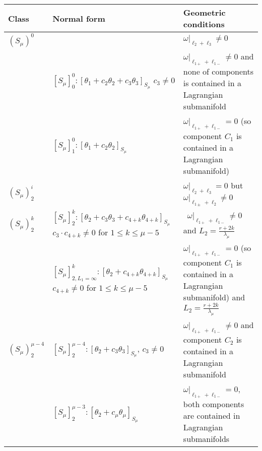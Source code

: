 \documentclass{amsart}
\theoremstyle{definition}
\numberwithin{equation}{section}
\begin{document}
\begin{center}
\begin{table}[h]
    \begin{small}
    \noindent
    \begin{tabular}{|p{1.2cm}|p{4.6cm}|p{6cm}|}
          
            \hline
    Class &  Normal form & Geometric conditions  \\ \hline

   $(S_{\mu})^0$ & & $ \omega|_{\ell_2+\ell_3} \ne 0$  \\ \cline{2-3}
         & $[S_{\mu}]^0_0: [\theta _1 + c_2\theta _2 + c_3\theta _3]_{S_{\mu}}$
   \newline $ c_3\ne 0$ & $\omega|_{\ell_{1+}+\ell_{1-}}\! \ne 0$ \; and  none of components is contained in a Lagrangian submanifold \\ \cline{2-3}
     & $[S_{\mu}]^0_1: [\theta _1 +c_2\theta _2 ]_{S_{\mu}}$ & $\omega |_{\ell_{1+}+\ell_{1-}}\!=0$ \; (so component $C_1$ is contained in a Lagrangian submanifold) \\ \hline \hline

  $(S_{\mu}\!)^{i}_2$ & &  $\omega|_{\ell_2+\ell_3} = 0$ but $\omega|_{\ell_{1\pm}+\ell_2} \ne 0$ \\ \hline
 $(S_{\mu}\!)^{k}_2$  & $[S_{\mu}]^{k}_2\!: [\theta _2\!+\! c_3\theta_3\!+\!c_{4+k}\theta_{4+k}]_{S_{\mu}}$
                                                    \newline $c_3\cdot c_{4+k} \ne 0$ for $1\leq k\leq\mu-5$ &  \ $\omega|_{\ell_{1+}+\ell_{1-}} \ne 0$ and $L_2=\frac{r+2k}{\lambda_{\mu}}$  \\ \cline{2-3}
 & $[S_{\mu}]^{k}_{2,L_1=\infty}\!: [\theta _2\!+\!c_{4+k}\theta_{4+k}]_{S_{\mu}}$
                                                    \newline $c_{4+k} \ne 0$ for $1\leq k\leq\mu-5$ & $\omega|_{\ell_{1+}+\ell_{1-}} = 0$ (so component $C_1$ is contained in a Lagrangian submanifold) and \ $L_2=\frac{r+2k}{\lambda_{\mu}}$  \\ \hline
 $(S_{\mu}\!)^{\mu-4}_2$ & $[S_{\mu}]^{\mu-4}_2: [\theta _2 +c_3\theta _3 ]_{S_{\mu}}$, $c_3\ne 0$ & $\omega|_{\ell_{1+}+\ell_{1-}} \ne 0$ and component $C_2$ is contained in a Lagrangian submanifold \\ \cline{2-3}

   & $[S_{\mu}]^{\mu-3}_2: [\theta _2  +c_{\mu} \theta _{\mu}]_{S_{\mu}}$ & $\omega|_{\ell_{1+}+\ell_{1-}} = 0$, both components are contained in  Lagrangian submanifolds\\ \hline\hline


\end{tabular}
\end{small}
\end{table}
\end{center}
\end{document}
